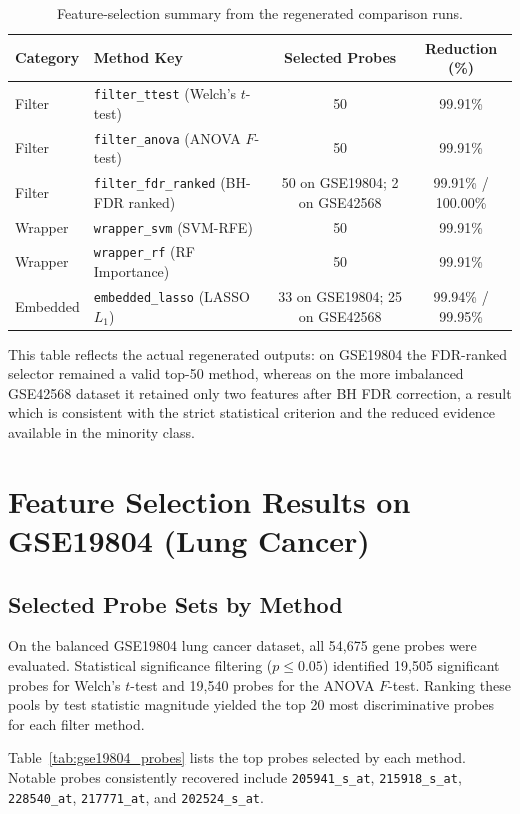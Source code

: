 \begin{table}[H]
\centering
\caption{Feature-selection summary from the regenerated comparison runs.}
\label{tab:feature_selection_counts}
\begin{tabular}{llcc}
\toprule
\textbf{Category} & \textbf{Method Key} & \textbf{Selected Probes} & \textbf{Reduction (\%)} \\
\midrule
Filter   & \texttt{filter\_ttest} (Welch's $t$-test) & 50 & 99.91\% \\
Filter   & \texttt{filter\_anova} (ANOVA $F$-test) & 50 & 99.91\% \\
Filter   & \texttt{filter\_fdr\_ranked} (BH-FDR ranked) & 50 on GSE19804; 2 on GSE42568 & 99.91\% / 100.00\% \\
Wrapper  & \texttt{wrapper\_svm} (SVM-RFE) & 50 & 99.91\% \\
Wrapper  & \texttt{wrapper\_rf} (RF Importance) & 50 & 99.91\% \\
Embedded & \texttt{embedded\_lasso} (LASSO $L_1$) & 33 on GSE19804; 25 on GSE42568 & 99.94\% / 99.95\% \\
\bottomrule
\end{tabular}
\end{table}

This table reflects the actual regenerated outputs: on GSE19804 the FDR-ranked selector remained a valid top-50 method, whereas on the more imbalanced GSE42568 dataset it retained only two features after BH FDR correction, a result which is consistent with the strict statistical criterion and the reduced evidence available in the minority class.

\section{Feature Selection Results on GSE19804 (Lung Cancer)}

\subsection{Selected Probe Sets by Method}

On the balanced GSE19804 lung cancer dataset, all 54,675 gene probes were evaluated. Statistical significance filtering ($p \le 0.05$) identified 19,505 significant probes for Welch's $t$-test and 19,540 probes for the ANOVA $F$-test. Ranking these pools by test statistic magnitude yielded the top 20 most discriminative probes for each filter method.

Table~\ref{tab:gse19804_probes} lists the top probes selected by each method. Notable probes consistently recovered include \texttt{205941\_s\_at}, \texttt{215918\_s\_at}, \texttt{228540\_at}, \texttt{217771\_at}, and \texttt{202524\_s\_at}.

